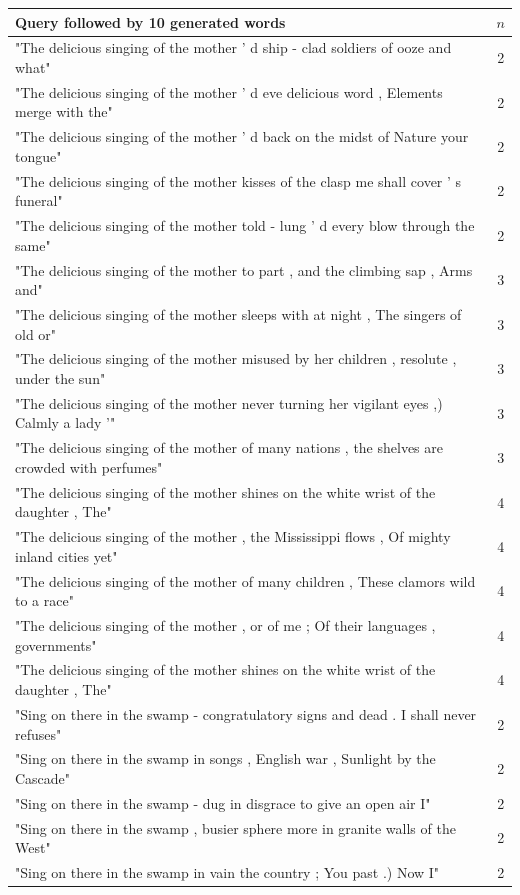 \documentclass[a4paper,12pt]{article}
\begin{document}
\begin{table}
\begin{tabular}{| l |c|}
\hline
Query followed by 10 generated words & $n$ \\ \hline
"The delicious singing of the mother ' d ship - clad soldiers of ooze and what" & 2\\ \hline
"The delicious singing of the mother ' d eve delicious word , Elements merge with the"& 2 \\ \hline
"The delicious singing of the mother ' d back on the midst of Nature your tongue" & 2 \\ \hline
"The delicious singing of the mother kisses of the clasp me shall cover ' s funeral" & 2 \\ \hline
"The delicious singing of the mother told - lung ' d every blow through the same" & 2 \\ \hline

"The delicious singing of the mother to part , and the climbing sap , Arms and" & 3 \\ \hline
"The delicious singing of the mother sleeps with at night , The singers of old or" & 3 \\ \hline
"The delicious singing of the mother misused by her children , resolute , under the sun" & 3 \\ \hline
"The delicious singing of the mother never turning her vigilant eyes ,) Calmly a lady '" & 3 \\ \hline
"The delicious singing of the mother of many nations , the shelves are crowded with perfumes" & 3 \\ \hline

"The delicious singing of the mother shines on the white wrist of the daughter , The" & 4 \\ \hline
"The delicious singing of the mother , the Mississippi flows , Of mighty inland cities yet" & 4 \\ \hline
"The delicious singing of the mother of many children , These clamors wild to a race" & 4 \\ \hline
"The delicious singing of the mother , or of me ; Of their languages , governments" & 4 \\ \hline
"The delicious singing of the mother shines on the white wrist of the daughter , The" & 4 \\ \hline

"Sing on there in the swamp - congratulatory signs and dead . I shall never refuses" & 2\\ \hline
"Sing on there in the swamp in songs , English war , Sunlight by the Cascade"& 2 \\ \hline
"Sing on there in the swamp - dug in disgrace to give an open air I" & 2 \\ \hline
"Sing on there in the swamp , busier sphere more in granite walls of the West" & 2 \\ \hline
"Sing on there in the swamp in vain the country ; You past .) Now I" & 2 \\ \hline


\end{tabular}
\end{table}
\end{document}

